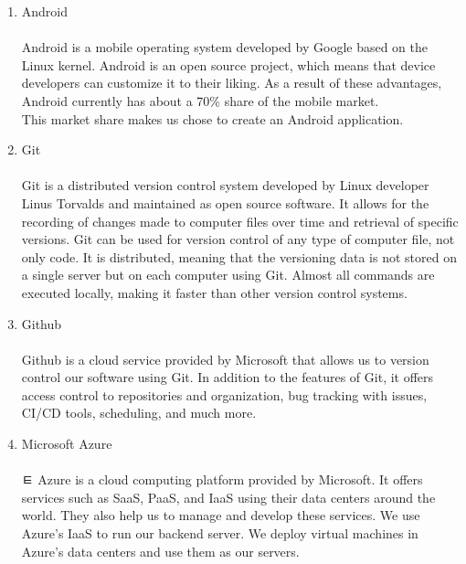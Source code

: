 \begin{enumerate}[label=\arabic*]
\begin{enumerate}[label=\alph*.]
            \item Android\\
            \\
            Android is a mobile operating system developed by Google based on the Linux kernel. Android is an open source project, which means that device developers can customize it to their liking. As a result of these advantages, Android currently has about a 70\% share of the mobile market.
            \cite{StatCounter}
            \\
            This market share makes us chose to create an Android application.\\

            \item Git\\
            \\
            Git is a distributed version control system developed by Linux developer Linus Torvalds and maintained as open source software. It allows for the recording of changes made to computer files over time and retrieval of specific versions. Git can be used for version control of any type of computer file, not only code. It is distributed, meaning that the versioning data is not stored on a single server but on each computer using Git. Almost all commands are executed locally, making it faster than other version control systems. \\

            \item Github\\
            \\
            Github is a cloud service provided by Microsoft that allows us to version control our software using Git. In addition to the features of Git, it offers access control to repositories and organization, bug tracking with issues, CI/CD tools, scheduling, and much more.\\

            \item Microsoft Azure\\
            \\
ㅌ            Azure is a cloud computing platform provided by Microsoft. It offers services such as SaaS, PaaS, and IaaS using their data centers around the world. They also help us to manage and develop these services. We use Azure's IaaS to run our backend server. We deploy virtual machines in Azure's data centers and use them as our servers.\\


\end{enumerate}
\end{enumerate}
